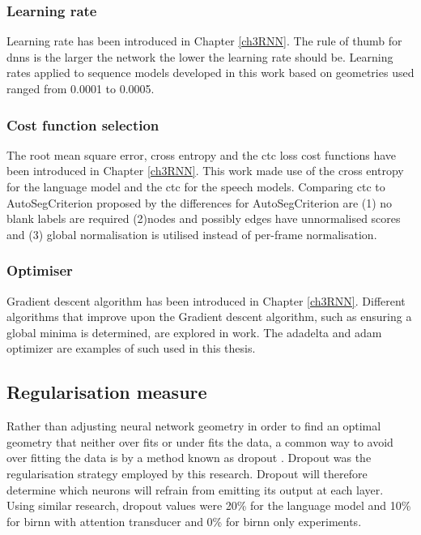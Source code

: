 \subsubsection{Learning rate}
Learning rate has been introduced in Chapter \ref{ch3RNN}. The rule of thumb for \acrshort{dnn}s is the larger the network the lower the learning rate should be.  Learning rates applied to sequence models developed in this work based on geometries used ranged from 0.0001 to 0.0005.
\subsubsection{Cost function selection}
The root mean square error, cross entropy and the \acrshort{ctc} loss cost functions have been introduced in Chapter \ref{ch3RNN}.  This work made use of the cross entropy for the language model and the \acrshort{ctc} for the speech models. Comparing \acrshort{ctc} to AutoSegCriterion proposed by \citep{collobert2016wav2letter} the differences for AutoSegCriterion are (1) no blank labels are required (2)nodes and  possibly edges have unnormalised scores and (3) global normalisation is utilised instead of per-frame normalisation.
\subsubsection{Optimiser}
Gradient descent algorithm has been introduced in Chapter \ref{ch3RNN}.  Different algorithms that improve upon the Gradient descent algorithm, such as ensuring a global minima is determined, are explored in work.  The adadelta and adam optimizer are examples of such used in this thesis.

\subsection{Regularisation measure}
Rather than adjusting neural network geometry in order to find an optimal geometry that neither over fits or under fits the data, a common way to avoid over fitting the data is by a method known as dropout \citep{srivastava2014dropout}.  Dropout was the regularisation strategy employed by this research.  Dropout will therefore determine which neurons will refrain from emitting its output at each layer. Using similar research, dropout values were 20\% for the language model and 10\% for \acrshort{birnn} with attention transducer and 0\% for \acrshort{birnn} only experiments.

